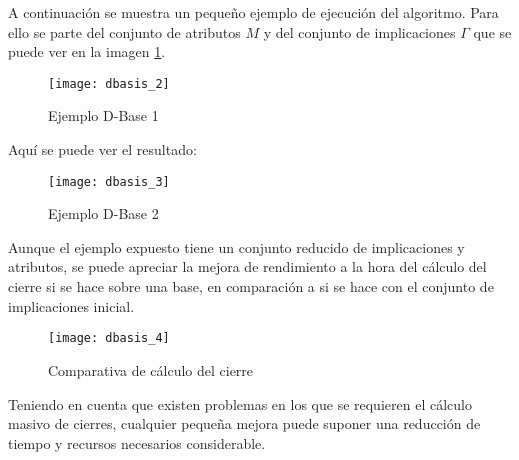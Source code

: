 A continuaci\'on se muestra un peque\~no ejemplo de ejecuci\'on del algoritmo. Para ello se parte del conjunto de atributos \(M\) y del conjunto de implicaciones \(\Gamma\) que se puede ver en la imagen \ref{fig:dbasis_2}.
\begin{figure}[H]
    \centering
    \texttt{[image: dbasis\_2]}
    \caption{Ejemplo D-Base 1}
    \label{fig:dbasis_2}
\end{figure} 
Aqu\'i se puede ver el resultado:
\begin{figure}[H]
    \centering
    \texttt{[image: dbasis\_3]}
    \caption{Ejemplo D-Base 2}
    \label{fig:dbasis_3}
\end{figure} 
Aunque el ejemplo expuesto tiene un conjunto reducido de implicaciones y atributos, se puede apreciar la mejora de rendimiento a la hora del c\'alculo del cierre si se hace sobre una base, en comparaci\'on a si se hace con el conjunto de implicaciones inicial.
\begin{figure}[H]
    \centering
    \texttt{[image: dbasis\_4]}
    \caption{Comparativa de c\'alculo del cierre}
    \label{fig:dbasis_4}
\end{figure} 

Teniendo en cuenta que existen problemas en los que se requieren el c\'alculo masivo de cierres, cualquier peque\~na mejora puede suponer una reducci\'on de tiempo y recursos necesarios considerable.